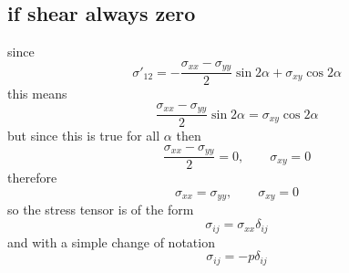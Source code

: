 \subsection{if shear always zero}
since 
\begin{equation}
    \sigma'_{12}=-\frac{\sigma_{xx}-\sigma_{yy}}{2}\sin2\alpha+\sigma_{xy}\cos2\alpha
\end{equation}
this means 
\begin{equation}
    \frac{\sigma_{xx}-\sigma_{yy}}{2}\sin2\alpha=\sigma_{xy}\cos2\alpha
\end{equation}
but since this is true for all \(\alpha\) then 
\begin{equation}
    \frac{\sigma_{xx}-\sigma_{yy}}{2}=0,\qquad \sigma_{xy}=0
\end{equation}
therefore
\begin{equation}
    \sigma_{xx}=\sigma_{yy},\qquad \sigma_{xy}=0
\end{equation}
so the stress tensor is of the form 
\begin{equation}
    \sigma_{ij} = \sigma_{xx}\delta_{ij}
\end{equation}
and with a simple change of notation
\begin{equation}
    \sigma_{ij} = -p\delta_{ij}
\end{equation}